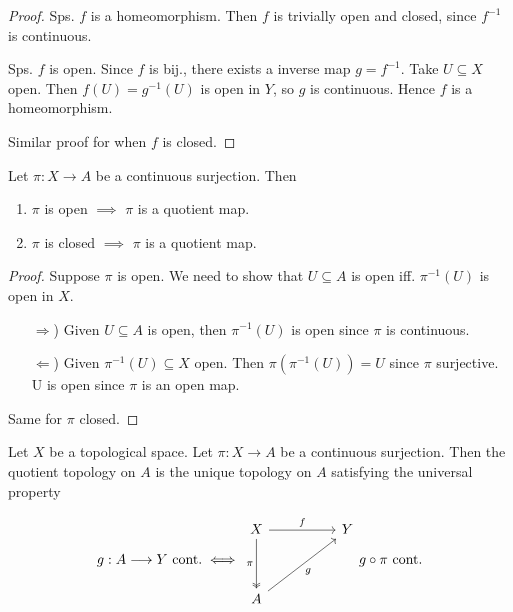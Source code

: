 \begin{proof}
   Sps. \( f \) is a homeomorphism.
   Then \( f \) is trivially open and closed,
   since \( {f}^{-1}  \) is continuous.

   Sps. \( f \) is open. Since \( f \) is bij.,
   there exists a inverse map \( g = {f}^{-1}  \).
   Take \( U \subseteq X \) open. Then \( f(U) = {g}^{-1} (U) \)
   is open in \( Y \), so \( g \) is continuous. Hence
   \( f \) is a homeomorphism.

   Similar proof for when \( f \) is closed.
\end{proof}

\begin{theorem}
  \label{thm:cont_surj_closed->quotient}
    Let \( \pi : X\to A    \) be a continuous surjection.
    Then
    \begin{enumerate}
      \item \( \pi \) is open \( \implies \)  \( \pi \) is a quotient map.
      \item \( \pi \) is closed \( \implies \)  \( \pi \) is a quotient map.
    \end{enumerate}
\end{theorem}

\begin{proof}
   Suppose \( \pi \) is open.
   We need to show that \( U \subseteq A \) is open iff. 
   \( {\pi}^{-1}(U)  \) is open in \( X \).
    \begin{enumerate}
      \item[\( \Rightarrow \))]
        Given \( U \subseteq A \) is open, then 
   \( {\pi}^{-1}(U)  \) is open since \( \pi \) is continuous.
      \item[\( \Leftarrow \))]
        Given \( {\pi}^{-1}(U)  \subseteq X \) open.
        Then \( \pi( {\pi}^{-1} (U) ) = U \) since \( \pi \) 
        surjective. U is open
        since \( \pi \) is an open map.
    \end{enumerate}

    Same for \( \pi \) closed.
\end{proof}

\begin{theorem}
   Let \( X \) be a topological space.
   Let \( \pi: X \to A \) be a continuous surjection.
   Then the quotient topology on \( A \)
   is the unique topology on \( A \)
   satisfying the universal property

   \begin{equation}
   g:A \longrightarrow Y \text{ cont.}
   \iff
\begin{tikzcd}
	X && Y \\
	\\
	A
	\arrow["f", from=1-1, to=1-3]
	\arrow["\pi"', two heads, from=1-1, to=3-1]
	\arrow["{g}"', from=3-1, to=1-3]
\end{tikzcd}
  g \circ \pi \text{ cont.}
  \end{equation}
\end{theorem}

